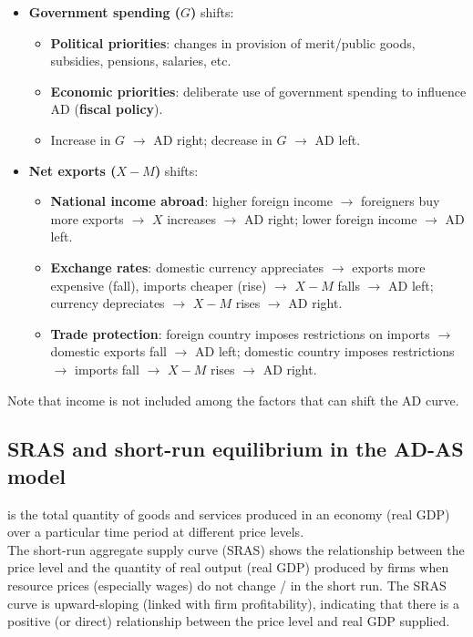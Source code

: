 \begin{itemize}
\begin{itemize}
    \item \textbf{Legal/institutional changes}: improved access to credit, secured property rights $\to$ more investment $\to$ AD right (especially relevant in developing economies).
  \end{itemize}
  \item \textbf{Government spending ($G$)} shifts:
  \begin{itemize}
    \item \textbf{Political priorities}: changes in provision of merit/public goods, subsidies, pensions, salaries, etc.
    \item \textbf{Economic priorities}: deliberate use of government spending to influence AD (\textbf{fiscal policy}).
    \item Increase in $G$ $\to$ AD right; decrease in $G$ $\to$ AD left.
  \end{itemize}
  \item \textbf{Net exports ($X - M$)} shifts:
  \begin{itemize}
    \item \textbf{National income abroad}: higher foreign income $\to$ foreigners buy more exports $\to$ $X$ increases $\to$ AD right; lower foreign income $\to$ AD left.
    \item \textbf{Exchange rates}: domestic currency appreciates $\to$ exports more expensive (fall), imports cheaper (rise) $\to$ $X - M$ falls $\to$ AD left; currency depreciates $\to$ $X - M$ rises $\to$ AD right.
    \item \textbf{Trade protection}: foreign country imposes restrictions on imports $\to$ domestic exports fall $\to$ AD left; domestic country imposes restrictions $\to$ imports fall $\to$ $X - M$ rises $\to$ AD right.
  \end{itemize}
\end{itemize}
Note that income is not included among the factors that can shift the AD curve.
\subsection{SRAS and short-run equilibrium in the AD-AS model}
 is the total quantity of goods and services produced in an economy (real GDP) over a particular time period at different price levels.\\
The short-run aggregate supply curve (SRAS) shows the relationship between the price level and the quantity of real output (real GDP) produced by firms when resource prices (especially wages) do not change / in the short run. The SRAS curve is upward-sloping (linked with firm profitability), indicating that there is a positive (or direct) relationship between the price level and real GDP supplied.
